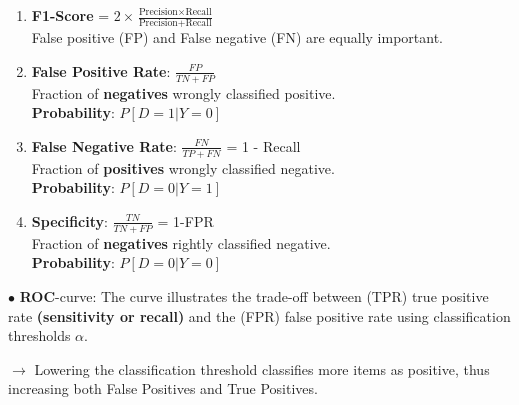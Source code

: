 \documentclass[letterpaper, 10.5pt,landscape]{article}
\begin{document}
\begin{multicols*}{3}
\begin{enumerate}
    \item \textbf{F1-Score } = $\boxed{2 \times \frac{\text{Precision} \times \text{Recall}}{\text{Precision} + \text{Recall}}}$  \\
    False positive (FP) and False negative (FN) are equally important.
    \vspace{-2pt}

    \item \textbf{False Positive Rate}: \(\boxed{\frac{FP}{TN+FP}} \) \\
    Fraction of \textbf{negatives} wrongly classified positive. \\  \textbf{Probability}: $\boxed{P[D=1 | Y=0]}$
    \vspace{-2pt}

    \item \textbf{False Negative Rate}: \(\boxed{\frac{FN}{TP+FN}} \) = 1 - Recall  \\
    Fraction of \textbf{positives} wrongly classified negative.  \\
    \textbf{Probability}: $\boxed{P[D=0 | Y=1]}$
    \vspace{-2pt}
    
    \item \textbf{Specificity}: \(\boxed{\frac{TN}{TN+FP}} \) = 1-FPR  \\
    Fraction of \textbf{negatives} rightly classified negative.  \\\textbf{Probability}: $\boxed{P[D=0 | Y=0]}$
\end{enumerate}



$\bullet$ \textbf{ROC}-curve: The curve illustrates the trade-off between (TPR) true positive rate \textbf{(sensitivity or recall)} and the (FPR) false positive rate using classification thresholds $\alpha$.


$\rightarrow$ Lowering the classification threshold classifies more items as positive, thus increasing both False Positives and True Positives.

\vspace{-3pt}


\end{multicols*}
\end{document}
